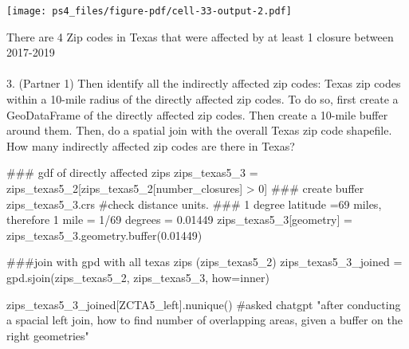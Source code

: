 \documentclass[
  letterpaper,
  DIV=11,
  numbers=noendperiod]{scrartcl}
\makeatletter
\let\oldparagraph\paragraph
\renewcommand{\paragraph}{
    \@ifstar
      \xxxParagraphStar
      \xxxParagraphNoStar
  }
\newcommand{\xxxParagraphStar}[1]{\oldparagraph*{#1}\mbox{}}
\newcommand{\xxxParagraphNoStar}[1]{\oldparagraph{#1}\mbox{}}
\newenvironment{Shaded}{\begin{snugshade}}{\end{snugshade}}
\newcommand{\AlertTok}[1]{\textcolor[rgb]{0.68,0.00,0.00}{#1}}
\newcommand{\BuiltInTok}[1]{\textcolor[rgb]{0.00,0.23,0.31}{#1}}
\newcommand{\CommentTok}[1]{\textcolor[rgb]{0.37,0.37,0.37}{#1}}
\newcommand{\DecValTok}[1]{\textcolor[rgb]{0.68,0.00,0.00}{#1}}
\newcommand{\FloatTok}[1]{\textcolor[rgb]{0.68,0.00,0.00}{#1}}
\newcommand{\NormalTok}[1]{\textcolor[rgb]{0.00,0.23,0.31}{#1}}
\newcommand{\OperatorTok}[1]{\textcolor[rgb]{0.37,0.37,0.37}{#1}}
\newcommand{\StringTok}[1]{\textcolor[rgb]{0.13,0.47,0.30}{#1}}
\makeatother
\begin{document}
\texttt{[image: ps4\_files/figure-pdf/cell-33-output-2.pdf]}

There are 4 Zip codes in Texas that were affected by at least 1 closure
between 2017-2019

\paragraph{3. (Partner 1) Then identify all the indirectly affected zip
codes: Texas zip codes within a 10-mile radius of the directly affected
zip codes. To do so, first create a GeoDataFrame of the directly
affected zip codes. Then create a 10-mile buffer around them. Then, do a
spatial join with the overall Texas zip code shapefile. How many
indirectly affected zip codes are there in
Texas?}\label{partner-1-then-identify-all-the-indirectly-affected-zip-codes-texas-zip-codes-within-a-10-mile-radius-of-the-directly-affected-zip-codes.-to-do-so-first-create-a-geodataframe-of-the-directly-affected-zip-codes.-then-create-a-10-mile-buffer-around-them.-then-do-a-spatial-join-with-the-overall-texas-zip-code-shapefile.-how-many-indirectly-affected-zip-codes-are-there-in-texas}

\begin{Shaded}
\begin{Highlighting}[]
\CommentTok{\#\#\# gdf of directly affected zips}
\NormalTok{zips\_texas5\_3 }\OperatorTok{=}\NormalTok{ zips\_texas5\_2[zips\_texas5\_2[}\StringTok{\textquotesingle{}number\_closures\textquotesingle{}}\NormalTok{] }\OperatorTok{\textgreater{}} \DecValTok{0}\NormalTok{]}
\CommentTok{\#\#\# create buffer}
\NormalTok{zips\_texas5\_3.crs }\CommentTok{\#check distance units.   }\AlertTok{\#\#\#}\CommentTok{ 1 degree latitude =69 miles, therefore 1 mile =  1/69 degrees = 0.01449}
\NormalTok{zips\_texas5\_3[}\StringTok{\textquotesingle{}geometry\textquotesingle{}}\NormalTok{] }\OperatorTok{=}\NormalTok{ zips\_texas5\_3.geometry.}\BuiltInTok{buffer}\NormalTok{(}\FloatTok{0.01449}\NormalTok{)}

\CommentTok{\#\#\#join with gpd with all texas zips (zips\_texas5\_2)}
\NormalTok{zips\_texas5\_3\_joined }\OperatorTok{=}\NormalTok{ gpd.sjoin(zips\_texas5\_2, zips\_texas5\_3, how}\OperatorTok{=}\StringTok{\textquotesingle{}inner\textquotesingle{}}\NormalTok{)}

\NormalTok{zips\_texas5\_3\_joined[}\StringTok{\textquotesingle{}ZCTA5\_left\textquotesingle{}}\NormalTok{].nunique()}
\CommentTok{\#asked chatgpt "after conducting a spacial left join, how to find number of overlapping areas, given a buffer on the right geometries"}
\end{Highlighting}
\end{Shaded}
\end{document}
